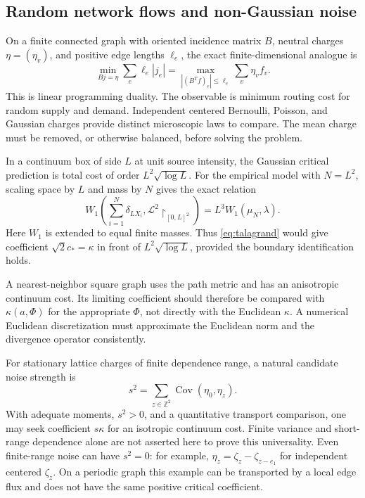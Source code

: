 \documentclass[11pt]{article}
\theoremstyle{definition}
\newcommand{\Z}{\mathbb Z}
\newcommand{\Cov}{\operatorname{Cov}}
\begin{document}
\subsection{Random network flows and non-Gaussian noise}
On a finite connected graph with oriented incidence matrix $B$, neutral
charges $\eta=(\eta_v)$, and positive edge lengths $\ell_e$, the exact
finite-dimensional analogue is
\begin{equation}\label{eq:graph}
  \min_{Bj=\eta}\sum_e\ell_e|j_e|
  =\max_{| (B^Tf)_e|\leq\ell_e}\sum_v\eta_vf_v.
\end{equation}
This is linear programming duality. The observable is minimum routing
cost for random supply and demand. Independent centered Bernoulli,
Poisson, and Gaussian charges provide distinct microscopic laws to
compare. The mean charge must be removed, or otherwise balanced,
before solving the problem.

In a continuum box of side $L$ at unit source intensity, the Gaussian
critical prediction is total cost of order $L^2\sqrt{\log L}$.
For the empirical model with $N=L^2$, scaling space by $L$ and mass by
$N$ gives the exact relation
\[
  W_1\!\left(\sum_{i=1}^N\delta_{LX_i},
                   \mathcal L^2\!\restriction_{[0,L]^2}\right)
  =L^3W_1(\mu_N,\lambda).
\]
Here $W_1$ is extended to equal finite masses. Thus
\eqref{eq:talagrand} would give coefficient $\sqrt2c_*=\kappa$ in front
of $L^2\sqrt{\log L}$, provided the boundary identification holds.

A nearest-neighbor square graph uses the path metric and has an
anisotropic continuum cost. Its limiting coefficient should therefore
be compared with $\kappa(a,\Phi)$ for the appropriate $\Phi$, not directly
with the Euclidean $\kappa$. A numerical Euclidean discretization must
approximate the Euclidean norm and the divergence operator consistently.

For stationary lattice charges of finite dependence range, a natural
candidate noise strength is
\[
  s^2=\sum_{z\in\Z^2}\Cov(\eta_0,\eta_z).
\]
With adequate moments, $s^2>0$, and a quantitative transport comparison,
one may seek coefficient $s\kappa$ for an isotropic continuum cost.
Finite variance and short-range dependence alone are not asserted here
to prove this universality. Even finite-range noise can have $s^2=0$:
for example, $\eta_z=\zeta_z-\zeta_{z-e_1}$ for independent centered
$\zeta_z$. On a periodic graph this example can be transported by a local edge flux and
does not have the same positive critical coefficient.
\end{document}
